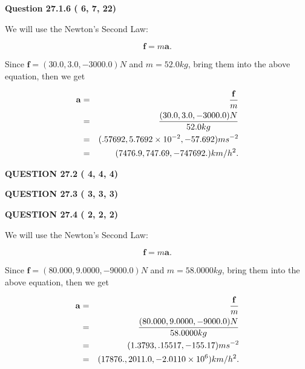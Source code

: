 \documentclass[12pt]{article}
\begin{document}
{\textbf{\Large{Question
27.1.6 
 (          6,          7,         22)
}}}
  
  
 
 

We will use the Newton's Second Law:
 
\[
\mathbf{f}=m\mathbf{a}.
\]
 
Since $\mathbf{f}=( %
30.0,  %
3.0,  %
-3000.0 )N$
and $m= %
52.0 kg$, bring them into the above equation, then we get
 
\begin{eqnarray*}
\mathbf{a}&=&\frac{\mathbf{f}}m  \\
&=&\frac{(
30.0 ,
3.0 ,
-3000.0 )N
}{ %
52.0 kg}  \\
&=&(
.57692 ,
5.7692 \times 10^{-2},
-57.692
)ms^{-2} \\
&=&(
7476.9 ,
747.69 ,
-747692.
)km/h^2.
\end{eqnarray*}
 
 
 
  
\vspace{0.2in}
  
{\textbf{\Large{QUESTION
27.2 
 (          4,          4,          4)
}}}
  
  
  
\vspace{0.2in}
  
{\textbf{\Large{QUESTION
27.3 
 (          3,          3,          3)
}}}
  
  
  
\vspace{0.2in}
  
{\textbf{\Large{QUESTION
27.4 
 (          2,          2,          2)
}}}
  
  
 
 

We will use the Newton's Second Law:
 
\[
\mathbf{f}=m\mathbf{a}.
\]
 
Since $\mathbf{f}=( %
80.000,  %
9.0000,  %
-9000.0 )N$
and $m= %
58.0000kg$, bring them into the above equation, then we get
 
\begin{eqnarray*}
\mathbf{a}&=&\frac{\mathbf{f}}m  \\
&=&\frac{(
80.000 ,
9.0000 ,
-9000.0 )N
}{ %
58.0000 kg}  \\
&=&(
1.3793 ,
.15517,
-155.17
)ms^{-2} \\
&=&(
17876. ,
2011.0 ,
-2.0110 \times 10^{6}
)km/h^2.
\end{eqnarray*}
 
\end{document}
